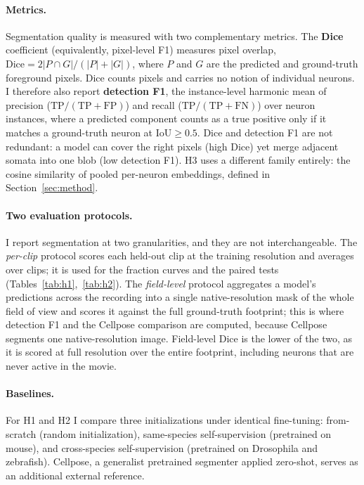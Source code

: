 \documentclass[twoside,11pt]{article}
\begin{document}
\paragraph{Metrics.} Segmentation quality is measured with two complementary metrics. The
\textbf{Dice} coefficient (equivalently, pixel-level F1) measures pixel overlap,
$\mathrm{Dice}=2|P\cap G|/(|P|+|G|)$, where $P$ and $G$ are the predicted and ground-truth foreground
pixels. Dice counts pixels and carries no notion of individual neurons. I
therefore also report \textbf{detection F1}, the instance-level harmonic mean of precision
($\mathrm{TP}/(\mathrm{TP}{+}\mathrm{FP})$) and recall ($\mathrm{TP}/(\mathrm{TP}{+}\mathrm{FN})$) over
neuron instances, where a predicted component counts as a true positive only if it matches a
ground-truth neuron at $\mathrm{IoU}\ge 0.5$. Dice and detection F1 are not redundant: a model can
cover the right pixels (high Dice) yet merge adjacent somata into one blob (low detection F1). H3 uses
a different family entirely: the cosine similarity of pooled per-neuron embeddings, defined in
Section~\ref{sec:method}.

\paragraph{Two evaluation protocols.} I report segmentation at two granularities, and they are not
interchangeable. The \emph{per-clip} protocol scores each held-out clip at the training resolution and
averages over clips; it is used for the fraction curves and the paired tests
(Tables~\ref{tab:h1},~\ref{tab:h2}). The \emph{field-level} protocol aggregates a model's predictions
across the recording into a single native-resolution mask of the whole field of view and scores it
against the full ground-truth footprint; this is where detection F1 and the Cellpose comparison are
computed, because Cellpose segments one native-resolution image. Field-level Dice is the lower of the
two, as it is scored at full resolution over the entire footprint, including neurons that are never
active in the movie.

\paragraph{Baselines.} For H1 and H2 I compare three initializations under identical fine-tuning:
from-scratch (random initialization), same-species self-supervision (pretrained on mouse), and
cross-species self-supervision (pretrained on Drosophila and zebrafish). Cellpose, a generalist
pretrained segmenter applied zero-shot, serves as an additional external reference.
\end{document}
